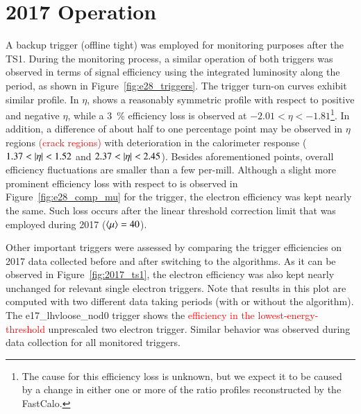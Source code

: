 \section{2017 Operation}\label{ssec:2017_ringer_operation}


A backup trigger (offline tight) was employed for
monitoring purposes after the TS1. During the monitoring process, a similar
operation of both triggers was observed in terms of signal efficiency using the
integrated luminosity along the period, as shown in
Figure~\ref{fig:e28_triggers}. The trigger
turn-on curves exhibit similar profile. In $\eta$, \rnn{} shows a reasonably symmetric
profile with respect to positive and negative $\eta$, while a
\SI{3}{\%} efficiency loss is observed at $-2.01<\eta<-1.81$\footnote{The cause for this efficiency loss is unknown, but we expect it to be caused by a change in either one or more of the ratio profiles reconstructed by the FastCalo.}. In addition, a difference of about
half to one percentage point may be observed in $\eta$ regions \textcolor{red}{(crack regions)} with deterioration in the calorimeter
response ($1.37 < \abseta < 1.52$ and $2.37 < \abseta < 2.45$). Besides
aforementioned points, overall efficiency fluctuations are smaller than a few
per-mill. Although a slight more prominent efficiency loss with respect to
\avgmu{} is observed in Figure~\ref{fig:e28_comp_mu} for the \rnn{} trigger, the
electron efficiency was kept nearly the same. Such loss occurs after the
linear threshold correction limit that was employed during 2017 ($\langle \mu \rangle=40$).

Other important triggers were assessed by comparing the trigger efficiencies on
2017 data collected before and after switching to the \rnn{} algorithms.  As it can be
observed in Figure~\ref{fig:2017_ts1}, the electron efficiency was also kept
nearly unchanged for relevant single electron triggers. Note that results in
this plot are computed with two different data taking periods (with or
without the \rnn{} algorithm). The e17\_lhvloose\_nod0 trigger shows the
\textcolor{red}{efficiency in the lowest-energy-threshold} 
unprescaled two electron trigger.
Similar behavior was observed during data collection for all monitored triggers.


